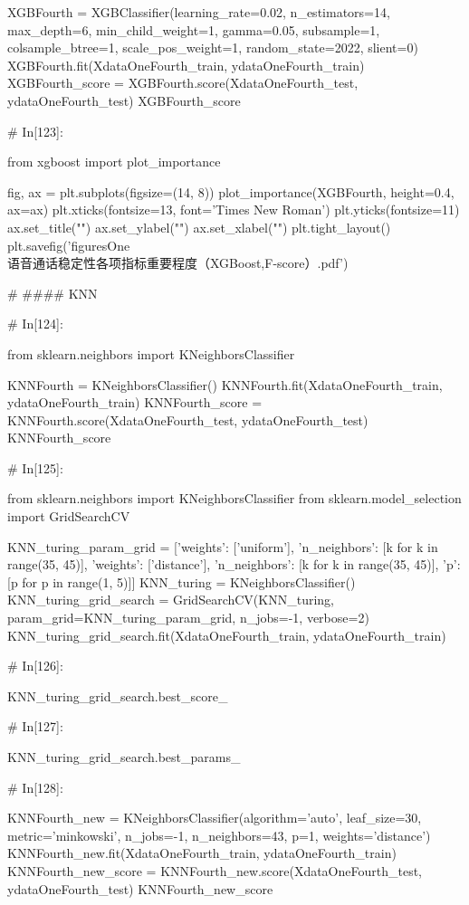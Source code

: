 \documentclass{MathorCupmodeling}
\begin{document}
\begin{python}
	XGBFourth = XGBClassifier(learning_rate=0.02,
							  n_estimators=14,
							  max_depth=6,
							  min_child_weight=1,
							  gamma=0.05,
							  subsample=1,
							  colsample_btree=1,
							  scale_pos_weight=1,
							  random_state=2022,
							  slient=0)
	XGBFourth.fit(XdataOneFourth_train, ydataOneFourth_train)
	XGBFourth_score = XGBFourth.score(XdataOneFourth_test, ydataOneFourth_test)
	XGBFourth_score
	
	# In[123]:
	
	
	from xgboost import plot_importance
	
	fig, ax = plt.subplots(figsize=(14, 8))
	plot_importance(XGBFourth, height=0.4, ax=ax)
	plt.xticks(fontsize=13, font='Times New Roman')
	plt.yticks(fontsize=11)
	ax.set_title("")
	ax.set_ylabel("")
	ax.set_xlabel("")
	plt.tight_layout()
	plt.savefig('figuresOne\\[附件1]语音通话稳定性各项指标重要程度（XGBoost,F-score）.pdf')
	
	# #### KNN
	
	# In[124]:
	
	
	from sklearn.neighbors import KNeighborsClassifier
	
	KNNFourth = KNeighborsClassifier()
	KNNFourth.fit(XdataOneFourth_train, ydataOneFourth_train)
	KNNFourth_score = KNNFourth.score(XdataOneFourth_test, ydataOneFourth_test)
	KNNFourth_score
	
	# In[125]:
	
	
	from sklearn.neighbors import KNeighborsClassifier
	from sklearn.model_selection import GridSearchCV
	
	KNN_turing_param_grid = [{'weights': ['uniform'],
							  'n_neighbors': [k for k in range(35, 45)]},
							 {'weights': ['distance'],
							  'n_neighbors': [k for k in range(35, 45)],
							  'p': [p for p in range(1, 5)]}]
	KNN_turing = KNeighborsClassifier()
	KNN_turing_grid_search = GridSearchCV(KNN_turing,
										  param_grid=KNN_turing_param_grid,
										  n_jobs=-1,
										  verbose=2)
	KNN_turing_grid_search.fit(XdataOneFourth_train, ydataOneFourth_train)
	
	# In[126]:
	
	
	KNN_turing_grid_search.best_score_
	
	# In[127]:
	
	
	KNN_turing_grid_search.best_params_
	
	# In[128]:
	
	
	KNNFourth_new = KNeighborsClassifier(algorithm='auto', leaf_size=30,
										 metric='minkowski',
										 n_jobs=-1,
										 n_neighbors=43, p=1,
										 weights='distance')
	KNNFourth_new.fit(XdataOneFourth_train, ydataOneFourth_train)
	KNNFourth_new_score = KNNFourth_new.score(XdataOneFourth_test, ydataOneFourth_test)
	KNNFourth_new_score
	

\end{python}
\end{document}
